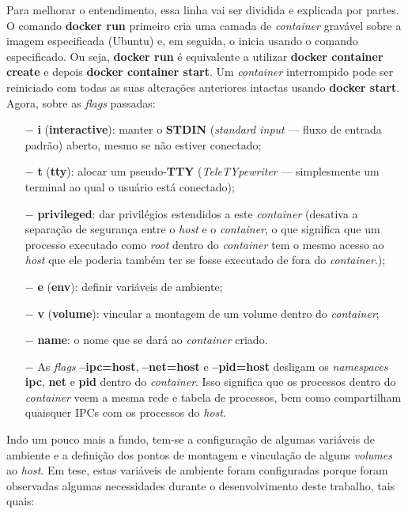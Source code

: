 \documentclass[
  12pt,				%
  openright,			%
  twoside,			%
  a4paper,			%
  english,			%
  french,				%
  spanish,			%
  brazil,				%
  ]{abntex2}
\begin{document}
Para melhorar o entendimento, essa linha vai ser dividida e explicada por partes. O comando \textbf{docker run} primeiro cria uma camada de \textit{container}
gravável sobre a imagem especificada (Ubuntu) e, em seguida, o inicia usando o comando especificado. Ou seja, \textbf{docker run} é equivalente a utilizar
\textbf{docker container create} e depois \textbf{docker container start}. Um \textit{container} interrompido pode ser reiniciado com todas as suas alterações anteriores
intactas usando \textbf{docker start}. Agora, sobre as \textit{flags} passadas:

\begin{itemize}
  \item[$-$] \textbf{i} (\textbf{interactive}): manter o \textbf{STDIN} (\textit{standard input} — fluxo de entrada padrão) aberto, mesmo se não estiver conectado;
  \item[$-$] \textbf{t} (\textbf{tty}): alocar um pseudo-\textbf{TTY} (\textit{TeleTYpewriter} — simplesmente um terminal ao qual o usuário está conectado);
  \item[$-$] \textbf{privileged}: dar privilégios estendidos a este \textit{container} (desativa a separação de segurança entre o \textit{host} e o
        \textit{container}, o que significa que um processo executado como \textit{root} dentro do \textit{container} tem o mesmo acesso ao \textit{host}
        que ele poderia também ter se fosse executado de fora do \textit{container}.);
  \item[$-$] \textbf{e} (\textbf{env}): definir variáveis de ambiente;
  \item[$-$] \textbf{v} (\textbf{volume}): vincular a montagem de um volume dentro do \textit{container};
  \item[$-$] \textbf{name}: o nome que se dará ao \textit{container} criado.
  \item[$-$] As \textit{flags} \textbf{--ipc=host}, \textbf{--net=host} e \textbf{--pid=host} desligam os \textit{namespaces} \textbf{ipc},
        \textbf{net} e \textbf{pid} dentro do \textit{container}. Isso significa que os processos dentro do \textit{container} veem a mesma rede e
        tabela de processos, bem como compartilham quaisquer IPCs \cite{Rusling-IPC:1999} com os processos do \textit{host}.
\end{itemize}

Indo um pouco mais a fundo, tem-se a configuração de algumas variáveis de ambiente e a definição dos pontos de montagem e vinculação de alguns
\textit{volumes} ao \textit{host}. Em tese, estas variáveis de ambiente foram configuradas porque foram observadas algumas necessidades durante o
desenvolvimento deste trabalho, tais quais:
\end{document}
